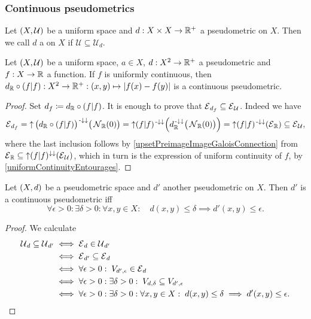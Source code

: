 \subsubsection{Continuous pseudometrics}
\begin{definition}
Let $\sSet{X, \mathcal{U}}$ be a uniform space and $d: X\times X\to \mathbb{R}^+$ a pseudometric on $X$. Then we call $d$ a  on $X$ if $\mathcal{U}\subseteq \mathcal{U}_d$.
\end{definition}

\begin{proposition} \label{continuousPseudometricFunctionLemma}
Let $\sSet{X, \mathcal{U}}$ be a uniform space, $a\in X$, $d: X^2\to \mathbb{R}^+$ a pseudometric and $f: X\to \mathbb{R}$ a function.
If $f$ is uniformly continuous, then $d_{\mathbb{R}}\circ (f|f): X^2\to \mathbb{R}^+: (x,y)\mapsto |f(x)- f(y)|$ is a continuous pseudometric.
\end{proposition}
\begin{proof}
Set $d_f \coloneqq d_{\mathbb{R}}\circ(f|f)$. It is enough to prove that $\operatorname{\mathcal{E}}_{d_f}\subseteq \operatorname{\mathcal{E}}_\mathcal{U}$. Indeed we have
\[ \operatorname{\mathcal{E}}_{d_f} = \operatorname{\uparrow} \big(d_{\mathbb{R}}\circ (f|f)\big)^{{\text{\hspace{0.15em}-}\downarrow}\downarrow}\big(\operatorname{\mathcal{N}}_{\mathbb{R}}(0)\big) = \operatorname{\uparrow} (f|f)^{{\text{\hspace{0.15em}-}\downarrow}\downarrow}\Big(d_{\mathbb{R}}^{{\text{\hspace{0.15em}-}\downarrow}\downarrow}\big(\operatorname{\mathcal{N}}_{\mathbb{R}}(0)\big)\Big) = \operatorname{\uparrow} (f|f)^{{\text{\hspace{0.15em}-}\downarrow}\downarrow}(\operatorname{\mathcal{E}}_{\mathbb{R}}) \subseteq \operatorname{\mathcal{E}}_\mathcal{U}, \]
where the last inclusion follows by \ref{upsetPreimageImageGaloisConnection} from $\operatorname{\mathcal{E}}_{\mathbb{R}} \subseteq \operatorname{\uparrow} (f|f)^{\downarrow\downarrow}(\operatorname{\mathcal{E}}_\mathcal{U})$, which in turn is the expression of uniform continuity of $f$, by \ref{uniformContinuityEntourages}.
\end{proof}

\begin{lemma} \label{continuousPseudometricOnMetricSpace}
Let $\sSet{X, d}$ be a pseudometric space and $d'$ another pseudometric on $X$. Then $d'$ is a continuous pseudometric iff
\[ \forall \epsilon > 0: \exists \delta > 0: \forall x,y\in X: \quad d(x,y)\leq \delta \implies d'(x,y) \leq \epsilon. \]
\end{lemma}
\begin{proof}
We calculate
\begin{align*}
\operatorname{\mathcal{U}}_d \subseteq \operatorname{\mathcal{U}}_{d'} &\iff \operatorname{\mathcal{E}}_{d} \in \operatorname{\mathcal{U}}_{d'} \\
&\iff \operatorname{\mathcal{E}}_{d'} \subseteq \operatorname{\mathcal{E}}_{d} \\
&\iff \forall \epsilon > 0: \; V_{d',\epsilon} \in \operatorname{\mathcal{E}}_d \\
&\iff \forall \epsilon > 0:\exists \delta > 0: \; V_{d, \delta} \subseteq V_{d',\epsilon} \\
&\iff \forall \epsilon > 0:\exists \delta > 0: \forall x,y\in X: \; d(x,y)\leq \delta \implies d'(x,y) \leq \epsilon.
\end{align*}
\end{proof}

